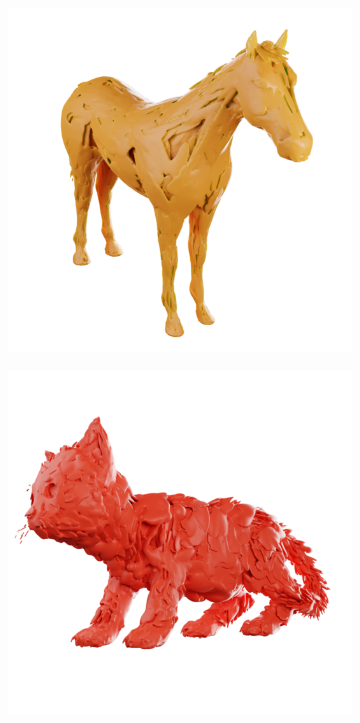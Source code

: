 \begin{figure}[tb]
\begin{subfigure}{0.19\linewidth}
  \end{subfigure}
  \hfill
  \begin{subfigure}{0.19\linewidth}
  \includegraphics[width=\linewidth]{images/meshes/horse_y_sugar.png}
  \end{subfigure}
  \hfill
  \begin{subfigure}{0.19\linewidth}
  \includegraphics[width=\linewidth]{images/meshes/kitten_sugar.png}

\end{subfigure}
\end{figure}
